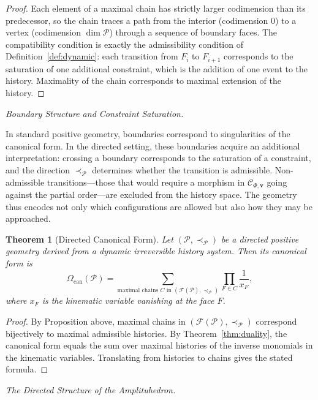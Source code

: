 \documentclass[12pt, oneside]{amsart}
\theoremstyle{plain}
\newtheorem{theorem}{Theorem}[section]
\theoremstyle{definition}
\theoremstyle{remark}
\newcommand{\CF}{\Omega_{\mathrm{can}}}
\newcommand{\Ccat}{\mathcal{C}_{\Phi,\mathbf{v}}}
\begin{document}
\begin{proof}
Each element of a maximal chain has strictly larger codimension than its predecessor, so the chain traces a path from the interior (codimension 0) to a vertex (codimension $\dim\mathcal{P}$) through a sequence of boundary faces. The compatibility condition is exactly the admissibility condition of Definition~\ref{def:dynamic}: each transition from $F_i$ to $F_{i+1}$ corresponds to the saturation of one additional constraint, which is the addition of one event to the history. Maximality of the chain corresponds to maximal extension of the history.
\end{proof}

\medskip\noindent\textit{Boundary Structure and Constraint Saturation.}

In standard positive geometry, boundaries correspond to singularities of the canonical form. In the directed setting, these boundaries acquire an additional interpretation: crossing a boundary corresponds to the saturation of a constraint, and the direction $\prec_{\mathcal{P}}$ determines whether the transition is admissible. Non-admissible transitions---those that would require a morphism in $\Ccat$ going against the partial order---are excluded from the history space. The geometry thus encodes not only which configurations are allowed but also how they may be approached.

\begin{theorem}[Directed Canonical Form]
\label{thm:directed-form}
Let $(\mathcal{P}, \prec_{\mathcal{P}})$ be a directed positive geometry derived from a dynamic irreversible history system. Then its canonical form is
\[
  \CF(\mathcal{P}) = \sum_{\text{maximal chains } C \text{ in } (\mathcal{F}(\mathcal{P}), \prec_{\mathcal{P}})} \prod_{F \in C} \frac{1}{x_F},
\]
where $x_F$ is the kinematic variable vanishing at the face $F$.
\end{theorem}

\begin{proof}
By Proposition above, maximal chains in $(\mathcal{F}(\mathcal{P}), \prec_{\mathcal{P}})$ correspond bijectively to maximal admissible histories. By Theorem~\ref{thm:duality}, the canonical form equals the sum over maximal histories of the inverse monomials in the kinematic variables. Translating from histories to chains gives the stated formula.
\end{proof}

\medskip\noindent\textit{The Directed Structure of the Amplituhedron.}
\end{document}
